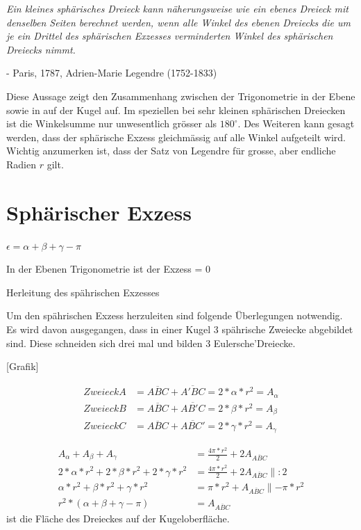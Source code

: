\begin{refsection}
\textit{Ein kleines sphärisches Dreieck kann näherungsweise 
wie ein ebenes Dreieck mit denselben Seiten berechnet 
werden, wenn alle Winkel des ebenen Dreiecks die um 
je ein Drittel des sphärischen Exzesses verminderten 
Winkel des sphärischen Dreiecks nimmt.}

- Paris, 1787, Adrien-Marie Legendre (1752-1833)


Diese Aussage zeigt den Zusammenhang zwischen der 
Trigonometrie in der Ebene sowie in auf der Kugel
auf. Im speziellen bei sehr kleinen sphärischen 
Dreiecken ist die Winkelsumme nur unwesentlich 
grösser als $180^{\circ}$. Des Weiteren kann gesagt werden,
dass der sphärische Exzess gleichmässig auf alle
Winkel aufgeteilt wird.
Wichtig anzumerken ist, dass der Satz von Legendre 
für grosse, aber endliche Radien $r$ gilt.

%

\section{Sphärischer Exzess}

$\epsilon = \alpha + \beta + \gamma - \pi$

In der Ebenen Trigonometrie ist der Exzess = 0

Herleitung des spährischen Exzesses

Um den spährischen Exzess herzuleiten sind 
folgende Überlegungen notwendig.
Es wird davon ausgegangen, dass in einer Kugel
3 spährische Zweiecke abgebildet sind. Diese schneiden
sich drei mal und bilden 3 Eulersche’Dreiecke.

[Grafik]

\begin{align*}
Zweieck A
&=
\overline{ABC} + \overline{A'BC} = 2*\alpha*r^{ 2 } = A_{ \alpha }\\
Zweieck B
&=
\overline{ABC} + \overline{AB'C} = 2*\beta*r^{ 2 } = A_{ \beta }\\
Zweieck C
&=
\overline{ABC} + \overline{ABC'} = 2*\gamma*r^{ 2 } = A_{ \gamma }
\end{align*}

\begin{align*}
A_{ \alpha } + A_{ \beta } + A_{ \gamma }
&=
\frac{ 4\pi*r^{ 2 } }{ 2 } + 2A_{ \overline{ ABC }} 
\\
2*\alpha*r^{ 2 } + 2*\beta*r^{ 2 } + 2*\gamma*r^{ 2 }
&=
\frac{ 4\pi*r^{ 2 } }{ 2 } + 2A_{ \overline{ ABC }} \parallel:2
\\
\alpha*r^{ 2 } + \beta*r^{ 2 } + \gamma*r^{ 2 }
&=
\pi*r^{ 2 } + A_{ \overline{ ABC }} \parallel-\pi*r^{ 2 }
\\
r^{ 2 }*\left(\alpha + \beta + \gamma - \pi\right)
&=
A_{ \overline{ ABC }}
\end{align*}
ist die Fläche des Dreieckes auf der Kugeloberfläche.








\end{refsection}
